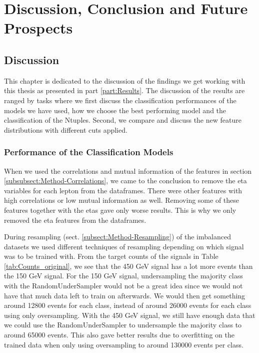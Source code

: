 \documentclass[a4paper, american, 12pt]{report}
\begin{document}
	\part{Discussion, Conclusion and Future Prospects}
	\label{part:Conclusion}
	
	\chapter{Discussion}
	\label{chap:Discussion}
	This chapter is dedicated to the discussion of the findings we get working with this thesis as presented in part \ref{part:Results}. The discussion of the results are ranged by tasks where we first discuss the classification performances of the models we have used, how we choose the best performing model and the classification of the Ntuples. Second, we compare and discuss the new feature distributions with different cuts applied.
	
	
	\section{Performance of the Classification Models}
	\label{sect:Discussion-PerformanceEval}	
	When we used the correlations and mutual information of the features in section \ref{subsubsect:Method-Correlations}, we came to the conclusion to remove the eta variables for each lepton from the dataframes. There were other features with high correlations or low mutual information as well. Removing some of these features together with the etas gave only worse results. This is why we only removed the eta features from the dataframes.
	
	During resampling (sect. \ref{subsect:Method-Resampling}) of the imbalanced datasets we used different techniques of resampling depending on which signal was to be trained with. From the target counts of the signals in Table \ref{tab:Counts_original}, we see that the 450 GeV signal has a lot more events than the 150 GeV signal. For the 150 GeV signal, undersampling the majority class with the RandomUnderSampler would not be a great idea since we would not have that much data left to train on afterwards. We would then get something around 12800 events for each class, instead of around 26000 events for each class using only oversampling. With the 450 GeV signal, we still have enough data that we could use the RandomUnderSampler to undersample the majority class to around 65000 events. This also gave better results due to overfitting on the trained data when only using oversampling to around 130000 events per class.
	
\end{document}
